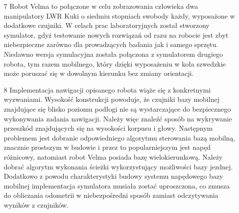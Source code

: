 \documentclass[20pt,a4paper]{article}
\begin{document}
\begin{itemize}
    \item[7] 
    Robot Velma to połączone w celu zobrazowania człowieka dwa manipulatory LWR Kuki o siedmiu stopniach swobody każdy, wyposażone w dodatkowe czujniki. 
    W celach prac laboratoryjnych został stworzony symulator, gdyż testowanie nowych rozwiązań od razu na robocie jest zbyt niebezpieczne zarówno dla prowadzących badania jak i samego sprzętu.
    Niedawno wersja symulacyjna została połączona z symulatorem drugiego robota, tym razem mobilnego, który dzięki wyposażeniu w koła szwedzkie może poruszać się w dowolnym kierunku bez zmiany orientacji.
    \item[8] Implementacja nawigacji opisanego robota wiąże się z konkretnymi wyzwaniami.
    	Wysokość konstrukcji powoduje, że czujniki bazy mobilnej znajdujące się blisko poziomu podłogi nie są wystarczające do bezpiecznego wykonywania zadania nawigacji.
    	Należy więc znaleźć sposób na wykrywanie przeszkód znajdujących się na wysokości korpusu i głowy.
    	Następnym problemem jest dobranie odpowiedniego algorytmu sterowania bazą mobilną, znacznie prostszym w budowie i przez to popularniejszym jest napęd różnicowy, natomiast robot Velma posiada bazę wielokierunkową.
    	Należy dobrać algorytm wykonania ścieżki wykorzystujący możliwości bazy jezdnej.
    	Dodatkowo z powodu charakterystyki budowy systemu napędowego bazy mobilnej implementacja symulatora musiała zostać uproszczona, co zmusza do obliczania odometrii w niebezpośredni sposób zamiast odczytywania wyników z czujników.
    	

\end{itemize}
\end{document}
